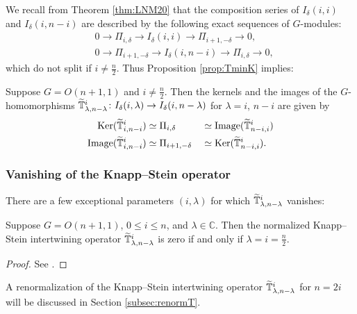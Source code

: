 We recall from Theorem \ref{thm:LNM20}
 that the composition series of $I_{\delta}(i,i)$ and $I_{\delta}(i,n-i)$
 are described by the following exact sequences of $G$-modules:
\begin{align*}
&0 \to \Pi_{i,\delta} \to I_{\delta}(i,i) \to \Pi_{i+1,-\delta} \to 0, 
\\
&0 \to \Pi_{i+1,-\delta} \to I_{\delta}(i,n-i) \to \Pi_{i,\delta} \to 0, 
\end{align*}
which do not split if $i \ne \frac n 2$.  
Thus Proposition \ref{prop:TminK} implies:
\begin{proposition}
\label{prop:Timage}
Suppose $G=O(n+1,1)$ and $i \ne \frac n 2$.  
Then the kernels and the images
 of the $G$-homomorphisms 
 $\widetilde{{\mathbb{T}}}_{{\lambda},{n-\lambda}}^{{i}} \colon I_{\delta}(i,\lambda) \to I_{\delta}(i,n-\lambda)$
 for $\lambda=i$, 
 $n-i$ are given by  
\begin{alignat*}{2}
{\operatorname{Ker}}(\widetilde{{\mathbb{T}}}_{{i},{n-i}}^{{i}}) 
&\simeq \Pi_{i,\delta}
&& \simeq {\operatorname{Image}}(\widetilde{{\mathbb{T}}}_{{n-i},{i}}^{{i}})
\\
{\operatorname{Image}}(\widetilde{{\mathbb{T}}}_{{i},{n-i}}^{{i}}) 
&\simeq \Pi_{i+1,-\delta}
&&\simeq {\operatorname{Ker}}(\widetilde{{\mathbb{T}}}_{{n-i},{i}}^{{i}}).  
\end{alignat*}
\end{proposition}

\subsubsection{Vanishing of the Knapp--Stein operator}

There are a few exceptional parameters
 $(i,\lambda)$ 
 for which $\widetilde{{\mathbb{T}}}_{{\lambda},{n-\lambda}}^{{i}}$ vanishes:

\begin{proposition}
\label{prop:Tvanish}
Suppose $G=O(n+1,1)$, 
 $0 \le i \le n$, 
 and $\lambda \in {\mathbb{C}}$.  
Then the normalized Knapp--Stein intertwining operator 
$\widetilde{{\mathbb{T}}}_{{\lambda},{n-\lambda}}^{{i}}$
 is zero
 if and only if 
 $\lambda=i=\frac n 2$.  
\end{proposition}



\begin{proof}
See \cite{xkresidue}.  
\end{proof}



A renormalization of the Knapp--Stein intertwining operator
 $\widetilde{{\mathbb{T}}}_{{\lambda},{n-\lambda}}^{{i}}$
 for $n=2i$ will be discussed in Section \ref{subsec:renormT}.  

